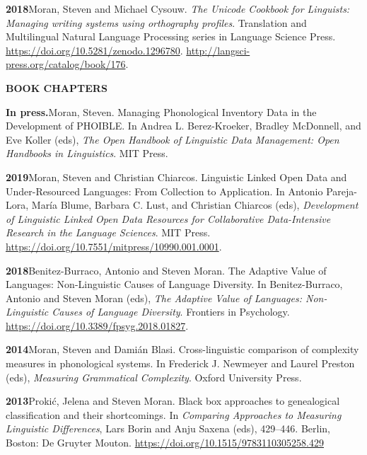 \documentclass[11pt]{article}
\newcommand{\hangpara}{
 \setlength{\parindent}{0in} %
 \hangindent=0.42in %
}
\begin{document}
\hangpara
{\bf 2018}\hspace{1ex}Moran, Steven and Michael Cysouw. {\it The Unicode Cookbook for Linguists: Managing writing systems using orthography profiles}. Translation and Multilingual Natural Language Processing series in Language Science Press. \url{https://doi.org/10.5281/zenodo.1296780}. \url{http://langsci-press.org/catalog/book/176}.


\vskip 20pt
\begin{flushleft}
{\bf BOOK CHAPTERS}
\end{flushleft}

\hangpara{\bf In press.}\hspace{1ex}Moran, Steven. Managing Phonological Inventory Data in the Development of PHOIBLE. In Andrea L. Berez-Kroeker, Bradley McDonnell, and Eve Koller (eds), \textit{The Open Handbook of Linguistic Data Management: Open Handbooks in Linguistics}. MIT Press.

\vskip 6pt
\hangpara
{\bf 2019}\hspace{1ex}Moran, Steven and Christian Chiarcos. Linguistic Linked Open Data and Under-Resourced Languages: From Collection to Application. In Antonio Pareja-Lora, María Blume, Barbara C. Lust, and Christian Chiarcos (eds), \textit{Development of Linguistic Linked Open Data Resources for Collaborative Data-Intensive Research in the Language Sciences}. MIT Press. \url{https://doi.org/10.7551/mitpress/10990.001.0001}.


\vskip 6pt
\hangpara
{\bf 2018}\hspace{1ex}Benitez-Burraco, Antonio and Steven Moran. The Adaptive Value of Languages: Non-Linguistic Causes of Language Diversity. In Benitez-Burraco, Antonio and Steven Moran (eds), \textit{The Adaptive Value of Languages: Non-Linguistic Causes of Language Diversity}. Frontiers in Psychology. \url{https://doi.org/10.3389/fpsyg.2018.01827}.

\vskip 6pt
\hangpara
{\bf 2014}\hspace{1ex}Moran, Steven and Dami{\'a}n Blasi. Cross-linguistic comparison of complexity measures in phonological systems. In Frederick J. Newmeyer and Laurel Preston (eds), {\it Measuring Grammatical Complexity}. Oxford University Press. 

\vskip 6pt
\hangpara
{\bf 2013}\hspace{1ex}Proki{\'c}, Jelena and Steven Moran. Black box approaches to genealogical classification and their shortcomings. In {\it Comparing Approaches to Measuring Linguistic Differences}, Lars Borin and Anju Saxena (eds), 429--446. Berlin, Boston: De Gruyter Mouton. \url{https://doi.org/10.1515/9783110305258.429}
\end{document}
